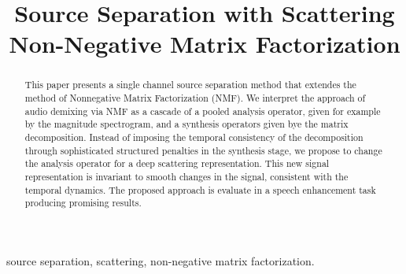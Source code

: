 \documentclass{article}
\title{Source Separation with Scattering Non-Negative Matrix Factorization}
\begin{document}
%
\maketitle
%
\begin{abstract}
This paper presents a single channel source separation method
that extendes the method of Nonnegative Matrix Factorization (NMF).
We interpret the approach of audio demixing via NMF as a cascade of a pooled analysis operator, given
for example by the magnitude spectrogram, and a synthesis operators given bye the matrix decomposition.
Instead of imposing the temporal consistency of the decomposition through
sophisticated structured penalties in the synthesis stage,
we propose to change the analysis operator for a deep scattering representation. This new signal representation is
invariant to smooth changes in the signal, consistent with the temporal dynamics.
The proposed approach is evaluate in a speech enhancement task producing promising results.
\end{abstract}
%
\begin{keywords}
source separation, scattering, non-negative matrix factorization.
\end{keywords}
%









\selectfont 
\end{document}

